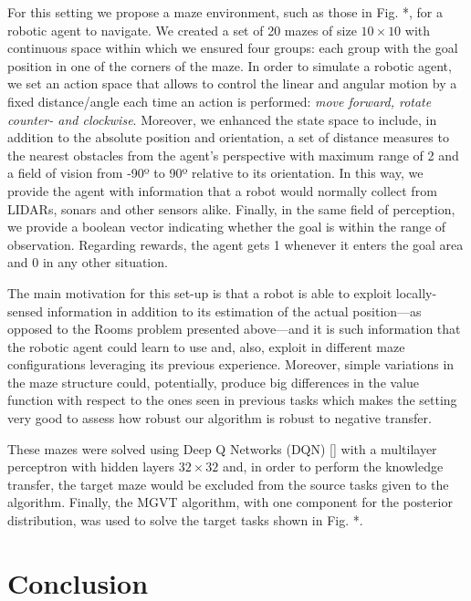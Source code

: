 \documentclass{article}
\begin{document}
For this setting we propose a maze environment, such as those in Fig. *, for a robotic agent to navigate. We created a set of 20 mazes of size $10\times10$ with continuous space within which we ensured four groups: each group with the goal position in one of the corners of the maze. In order to simulate a robotic agent, we set an action space that allows to control the linear and angular motion by a fixed distance/angle each time an action is performed: \emph{move forward, rotate counter- and clockwise}. Moreover, we enhanced the state space to include, in addition to the absolute position and orientation, a set of distance measures to the nearest obstacles from the agent's perspective with maximum range of 2 and a field of vision from -90º to 90º relative to its orientation. In this way, we provide the agent with information that a robot would normally collect from LIDARs, sonars and other sensors alike. Finally, in the same field of perception, we provide a boolean vector indicating whether the goal is within the range of observation. Regarding rewards, the agent gets 1 whenever it enters the goal area and 0 in any other situation. 

The main motivation for this set-up is that a robot is able to exploit locally-sensed information in addition to its estimation of the actual position---as opposed to the Rooms problem presented above---and it is such information that the robotic agent could learn to use and, also, exploit  in different maze configurations leveraging its previous experience. Moreover, simple variations in the maze structure could, potentially, produce big differences in the value function with respect to the ones seen in previous tasks which makes the setting very good to assess how robust our algorithm is robust to negative transfer.

These mazes were solved using Deep Q Networks (DQN) []  with a multilayer perceptron with hidden layers $32\times32$  and, in order to perform the knowledge transfer, the target maze would be excluded from the source tasks given to the algorithm. Finally, the MGVT algorithm, with one component for the posterior distribution, was used to solve the target tasks shown in Fig. *. 


\section{Conclusion}

{\small 


}
\end{document}
